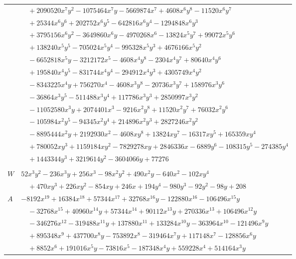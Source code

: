 \documentclass[11pt]{article}
\begin{document}
\begin{longtable}{@{}ll@{}}
 & $\quad +2090520x^{7}y^{2}-1075464x^{7}y-5669874x^{7}+4608x^{6}y^{8}-11520x^{6}y^{7}$\\
 & $\quad +25344x^{6}y^{6}+202752x^{6}y^{5}-642816x^{6}y^{4}-1294848x^{6}y^{3}$\\
 & $\quad +3795156x^{6}y^{2}-3649860x^{6}y-4970268x^{6}-13824x^{5}y^{7}+99072x^{5}y^{6}$\\
 & $\quad +138240x^{5}y^{5}-705024x^{5}y^{4}-995328x^{5}y^{3}+4676166x^{5}y^{2}$\\
 & $\quad -6652818x^{5}y-3212172x^{5}-4608x^{4}y^{8}-2304x^{4}y^{7}+80640x^{4}y^{6}$\\
 & $\quad +195840x^{4}y^{5}-831744x^{4}y^{4}-294912x^{4}y^{3}+4305749x^{4}y^{2}$\\
 & $\quad -8343225x^{4}y+756270x^{4}-4608x^{3}y^{8}-20736x^{3}y^{7}+158976x^{3}y^{6}$\\
 & $\quad -36864x^{3}y^{5}-511488x^{3}y^{4}+117786x^{3}y^{3}+2850997x^{3}y^{2}$\\
 & $\quad -11052580x^{3}y+2074401x^{3}-9216x^{2}y^{8}+11520x^{2}y^{7}+76032x^{2}y^{6}$\\
 & $\quad -105984x^{2}y^{5}-94345x^{2}y^{4}+214896x^{2}y^{3}+2827246x^{2}y^{2}$\\
 & $\quad -8895444x^{2}y+2192930x^{2}-4608xy^{8}+13824xy^{7}-16317xy^{5}+165359xy^{4}$\\
 & $\quad +780052xy^{3}+1159184xy^{2}-7829278xy+2846336x-6889y^{6}-108315y^{5}-274385y^{4}$\\
 & $\quad +1443344y^{3}+3219614y^{2}-3604066y+77276$\\
\addlinespace[3pt]
\multicolumn{2}{@{}l}{$i=33$, $m=64$, neighbours $26,34,37,38,39,41,42,90$}\\
$W$ & $52x^{3}y^{2}-236x^{3}y+256x^{3}-98x^{2}y^{2}+490x^{2}y-640x^{2}-102xy^{4}$\\
 & $\quad +470xy^{3}+226xy^{2}-854xy+246x+194y^{4}-980y^{3}-92y^{2}-98y+208$\\
$A$ & $-8192x^{19}+16384x^{18}+57344x^{17}+32768x^{16}y-122880x^{16}-106496x^{15}y$\\
 & $\quad -32768x^{15}+40960x^{14}y+57344x^{14}+90112x^{13}y+270336x^{13}+106496x^{12}y$\\
 & $\quad -346276x^{12}-319488x^{11}y+137880x^{11}+133284x^{10}y-363964x^{10}-121496x^{9}y$\\
 & $\quad +895348x^{9}+437700x^{8}y-753892x^{8}-319464x^{7}y+117148x^{7}-128856x^{6}y$\\
 & $\quad +8852x^{6}+191016x^{5}y-73816x^{5}-187348x^{4}y+559228x^{4}+514164x^{3}y$\\

\end{longtable}
\end{document}
